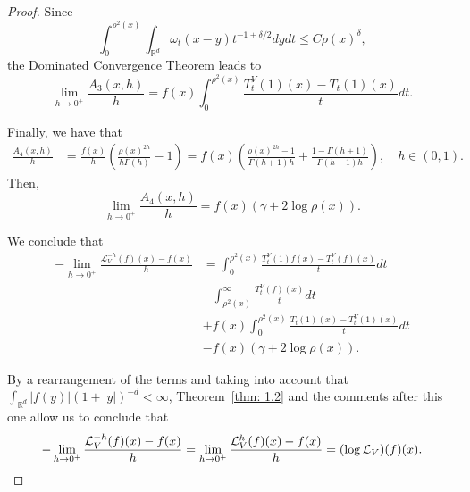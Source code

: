 \documentclass[10pt, a4paper, reqno]{amsart}
\theoremstyle{definition}
\theoremstyle{remark}
\newcommand{\RR}{\mathbb{R}}
\numberwithin{equation}{section}
\begin{document}
\begin{proof}
Since
\[
\int_0^{\rho^2(x)}\int_{\mathbb{R}^d}\omega_t(x-y)t^{-1+\delta/2}dydt\le C\rho(x)^\delta,
\]
the Dominated Convergence Theorem leads to
\[
\lim_{h\to 0^+}\frac{A_3(x,h)}{h}=f(x)\int_0^{\rho^2(x)}\frac{T_t^V(1)(x)-T_t(1)(x)}{t}dt.
\]



Finally, we have that
\begin{align*}
\frac{A_4(x,h)}{h}&=\frac{f(x)}{h}\left(\frac{\rho(x)^{2h}}{h\Gamma(h)}-1\right)=f(x)\left(\frac{\rho(x)^{2h}-1}{\Gamma(h+1)h}+ \frac{1-\Gamma(h+1)}{\Gamma(h+1)h}\right), \quad h\in (0,1).
\end{align*}
Then,
\[
\lim_{h\to 0^+}\frac{A_4(x,h)}{h}=f(x)( \gamma+2\log\rho(x)).
\]



We conclude that 
\begin{align*}
-\lim_{h\to 0^+}\frac{\mathcal{L}_V^{-h}(f)(x)-f(x)}{h}&=\int_0^{\rho^2(x)}\frac{T_t^V(1)f(x)-T_t^V(f)(x)}{t}dt\\
&-\int_{\rho^2(x)}^\infty \frac{T_t^V(f)(x)}{t}dt\\
&+f(x)\int_0^{\rho^2(x)}\frac{T_t(1)(x)-T_t^V(1)(x)}{t}dt\\
&-f(x)(\gamma+2\log\rho(x)).
\end{align*}


    By a rearrangement of the terms and taking into account that $\int_{\mathbb{R}^d}|f(y)|(1+|y|)^{-d}<\infty$,  Theorem~\ref{thm: 1.2} and the comments after this one allow us to conclude that
    \[-\lim_{h\to 0^+}\frac{\mathcal{L}^{-h}_V(f)(x)-f(x)}{h}=\lim_{h\to 0^+}\frac{\mathcal{L}^{h}_V(f)(x)-f(x)}{h}=(\log \mathcal{L}_V)(f)(x).\qedhere\]
\end{proof}
\end{document}

